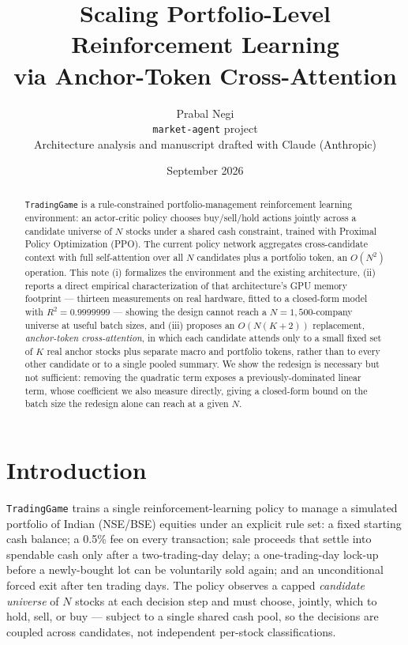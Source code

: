 \documentclass[11pt]{article}
\title{Scaling Portfolio-Level Reinforcement Learning\\
       via Anchor-Token Cross-Attention}
\author{Prabal Negi \\ \small \texttt{market-agent} project \\[2pt]
        \small Architecture analysis and manuscript drafted with Claude (Anthropic)}
\date{September 2026}
\begin{document}
\maketitle

\begin{abstract}
\noindent
\texttt{TradingGame} is a rule-constrained portfolio-management reinforcement
learning environment: an actor-critic policy chooses buy/sell/hold actions
jointly across a candidate universe of $N$ stocks under a shared cash
constraint, trained with Proximal Policy Optimization (PPO). The current
policy network aggregates cross-candidate context with full self-attention
over all $N$ candidates plus a portfolio token, an $O(N^2)$ operation. This
note (i) formalizes the environment and the existing architecture, (ii)
reports a direct empirical characterization of that architecture's GPU memory
footprint --- thirteen measurements on real hardware, fitted to a closed-form
model with $R^2 = 0.9999999$ --- showing the design cannot reach a
$N{=}1{,}500$-company universe at useful batch sizes, and (iii) proposes an
$O(N(K{+}2))$ replacement, \emph{anchor-token cross-attention}, in which each
candidate attends only to a small fixed set of $K$ real anchor stocks plus
separate macro and portfolio tokens, rather than to every other candidate or
to a single pooled summary. We show the redesign is necessary but not
sufficient: removing the quadratic term exposes a previously-dominated linear
term, whose coefficient we also measure directly, giving a closed-form bound
on the batch size the redesign alone can reach at a given $N$.
\end{abstract}

\tableofcontents

\section{Introduction}

\texttt{TradingGame} trains a single reinforcement-learning policy to manage
a simulated portfolio of Indian (NSE/BSE) equities under an explicit rule
set: a fixed starting cash balance; a 0.5\% fee on every transaction; sale
proceeds that settle into spendable cash only after a two-trading-day delay;
a one-trading-day lock-up before a newly-bought lot can be voluntarily sold
again; and an unconditional forced exit after ten trading days. The policy
observes a capped \emph{candidate universe} of $N$ stocks at each decision
step and must choose, jointly, which to hold, sell, or buy --- subject to a
single shared cash pool, so the decisions are coupled across candidates, not
independent per-stock classifications.
\end{document}
